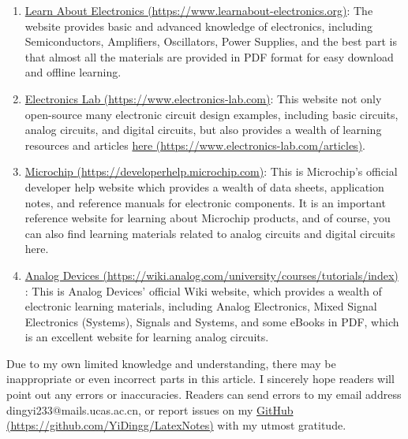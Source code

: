 \documentclass[UTF8]{report}
\begin{document}
\begin{enabstract}
\begin{enumerate}
    \item \href{https://www.learnabout-electronics.org}{  Learn About Electronics  {\color{black} (https://www.learnabout-electronics.org)}}: The website provides basic and advanced knowledge of electronics, including Semiconductors, Amplifiers, Oscillators, Power Supplies, and the best part is that almost all the materials are provided in PDF format for easy download and offline learning.
    
    \item \href{https://www.electronics-lab.com}{  Electronics Lab  {\color{black} (https://www.electronics-lab.com)}}: This website not only open-source many electronic circuit design examples, including basic circuits, analog circuits, and digital circuits, but also provides a wealth of learning resources and articles \href{https://www.electronics-lab.com/articles/}{here {\color{black} (https://www.electronics-lab.com/articles)}}.

    \item \href{https://developerhelp.microchip.com}{  Microchip  {\color{black} (https://developerhelp.microchip.com)}}: This is Microchip's official developer help website which provides a wealth of data sheets, application notes, and reference manuals for electronic components. It is an important reference website for learning about Microchip products, and of course, you can also find learning materials related to analog circuits and digital circuits here. 
    
    \item \href{https://wiki.analog.com/university/courses/tutorials/index}{Analog Devices {\color{black}(https://wiki.analog.com/university/courses/tutorials/index)}} : This is Analog Devices' official Wiki website, which provides a wealth of electronic learning materials, including Analog Electronics, Mixed Signal Electronics (Systems), Signals and Systems, and some eBooks in PDF, which is an excellent website for learning analog circuits.
\end{enumerate}
    
    Due to my own limited knowledge and understanding, there may be inappropriate or even incorrect parts in this article. I sincerely hope readers will point out any errors or inaccuracies. Readers can send errors to my email address {\color{blue} dingyi233@mails.ucas.ac.cn}, or report issues on my \href{https://github.com/YiDingg/LatexNotes}{GitHub {\color{black} (https://github.com/YiDingg/LatexNotes)}} with my utmost gratitude.
\end{enabstract}
\end{document}
